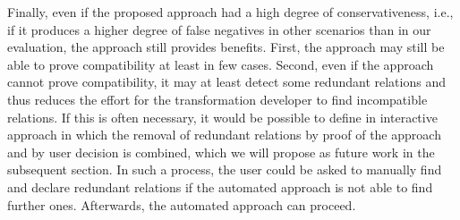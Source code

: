Finally, even if the proposed approach had a high degree of conservativeness, i.e., if it produces a higher degree of false negatives in other scenarios than in our evaluation, the approach still provides benefits.
First, the approach may still be able to prove compatibility at least in few cases.
Second, even if the approach cannot prove compatibility, it may at least detect some redundant relations and thus reduces the effort for the transformation developer to find incompatible relations.
If this is often necessary, it would be possible to define in interactive approach in which the removal of redundant relations by proof of the approach and by user decision is combined, which we will propose as future work in the subsequent section. %
In such a process, the user could be asked to manually find and declare redundant relations if the automated approach is not able to find further ones.
Afterwards, the automated approach can proceed.




